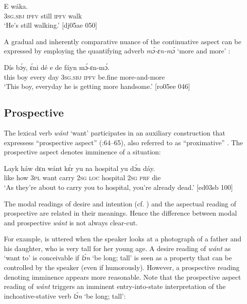 \ea%
    \label{ex:key:370}
    \gll E        wáka.\\
\textsc{3sg.sbj}  \textsc{ipfv}  still  \textsc{ipfv}  walk\\

\glt ‘He’s still walking.’ [dj05ae 050]
\z

A gradual and inherently comparative nuance of the continuative aspect can be expressed by employing the quantifying adverb \textit{mɔ́-ɛn-mɔ́} ‘more and more’ : 


\ea%
    \label{ex:key:371}
    \gll Dís  bɔ́y,    ɛ́ni    dé  e    de  fáyn    mɔ́-ɛn-mɔ́.\\
this  boy    every  day  \textsc{3sg.sbj}  \textsc{ipfv}  be.fine  more-and-more\\

\glt ‘This boy, everyday he is getting more handsome.’ [ro05ee 046]
\z

\subsection{Prospective} 

The lexical verb \textit{wánt} ‘want’ participates in an auxiliary construction that expressess “prospective aspect” (\citealt{Comrie1976}:64–65), also referred to as “proximative” \citep[36]{Heine1994}. The prospective aspect denotes imminence of a situation:


\ea%
    \label{ex:key:372}
    \gll Layk  háw    dɛn  wánt  kɛ́r    yu  na  hospital
yu  dɔ́n    dáy.\\
like    how    \textsc{3pl}  want  carry  \textsc{2sg}  \textsc{loc}  hospital
\textsc{2sg}  \textsc{prf}    die\\

\glt ‘As they’re about to carry you to hospital, you’re already dead.’ [ed03sb 100]
\z

The modal readings of desire and intention (cf. ) and the aspectual reading of prospective are related in their meanings. Hence the difference between modal and prospective \textit{wánt} is not always clear-cut.


For example,  is uttered when the speaker looks at a photograph of a father and his daughter, who is very tall for her young age. A desire reading of \textit{wánt} as ‘want to’ is conceivable if \textit{lɔ́n} ‘be long; tall’ is seen as a property that can be controlled by the speaker (even if humorously). However, a prospective reading denoting imminence appears more reasonable. Note that the prospective aspect reading of \textit{wánt} triggers an imminent entry-into-state interpretation of the inchoative-stative verb \textit{lɔ́n} ‘be long; tall’:



